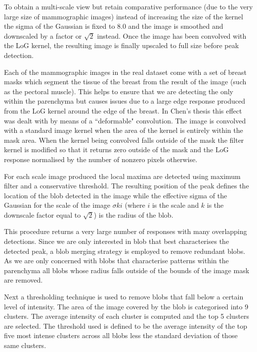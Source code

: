 To obtain a multi-scale view but retain comparative performance (due to the very large size of mammographic images) instead of increasing the size of the kernel the sigma of the Gaussian is fixed to 8.0 and the image is smoothed and downscaled by a factor or $\sqrt{2}$ instead. Once the image has been convolved with the LoG kernel, the resulting image is finally upscaled to full size before peak detection.

Each of the mammographic images in the real dataset come with a set of breast masks which segment the tissue of the breast from the result of the image (such as the pectoral muscle). This helps to ensure that we are detecting the only within the parenchyma but causes issues due to a large edge response produced from the LoG kernel around the edge of the breast. In Chen's thesis this effect was dealt with by means of a ``deformable" convolution. The image is convolved with a standard image kernel when the area of the kernel is entirely within the mask area. When the kernel being convolved falls outside of the mask the filter kernel is modified so that it returns zero outside of the mask and the LoG response normalised by the number of nonzero pixels otherwise.

For each scale image produced the local maxima are detected using maximum filter and a conservative threshold. The resulting position of the peak defines the location of the blob detected in the image while the effective sigma of the Gaussian for the scale of the image $\sigma k i$ (where $i$ is the scale and $k$ is the downscale factor equal to $\sqrt{2}$) is the radius of the blob.

This procedure returns a very large number of responses with many overlapping detections. Since we are only interested in blob that best characterises the detected peak, a blob merging strategy is employed to remove redundant blobs. As we are only concerned with blobs that characterise patterns within the parenchyma all blobs whose radius falls outside of the bounds of the image mask are removed. 

Next a thresholding technique is used to remove blobs that fall below a certain level of intensity. The area of the image covered by the blob is categorised into 9 clusters. The average intensity of each cluster is computed and the top 5 clusters are selected. The threshold used is defined to be the average intensity of the top five most intense clusters across all blobs less the standard deviation of those same clusters. 

